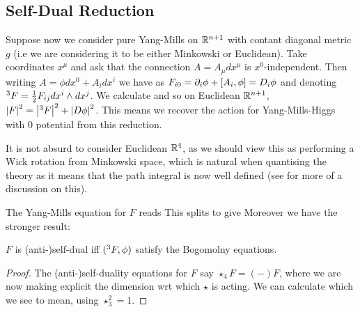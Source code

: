 \documentclass{article}
\begin{document}
\subsection{Self-Dual Reduction}
Suppose now we consider pure Yang-Mills on $\mathbb{R}^{n+1}$ with contant diagonal metric $g$ (i.e we are considering it to be either Minkowski or Euclidean). Take coordinates $x^\mu$ and ask that the connection $A = A_\mu dx^\mu$ is $x^0$-independent. Then writing $A = \phi dx^0 + A_i dx^i$ we have 
as $F_{i0} = \partial_i \phi + \left[ A_i, \phi \right] = D_i \phi$ and denoting $\indices{^3}F = \frac{1}{2}F_{ij} dx^i \wedge dx^j$. We calculate
and so on Euclidean $\mathbb{R}^{n+1}$, $\abs{F}^2 = \abs{\indices{^3}F}^2 + \abs{D\phi}^2 $. This means we recover the action for Yang-Mills-Higgs with $0$ potential from this reduction. 
\begin{remark}
	It is not absurd to consider Euclidean $\mathbb{R}^4$, as we should view this as performing a Wick rotation from Minkowski space, which is natural when quantising the theory as it means that the path integral is now well defined (see \cite{Ward1991} for more of a discussion on this). 
\end{remark}
The Yang-Mills equation for $F$ reads 
This splits to give 
Moreover we have the stronger result:
\begin{prop}
	$F$ is (anti-)self-dual iff $(\indices{^3}F,\phi)$ satisfy the Bogomolny equations. 
\end{prop}
\begin{proof}
	The (anti-)self-duality equations for $F$ say $\star_4 F = (-)F$, where we are now making explicit the dimension wrt which $\star$ is acting. We can calculate 
which we see to mean, using $\star_3^2=1$.  
\end{proof}
\end{document}
